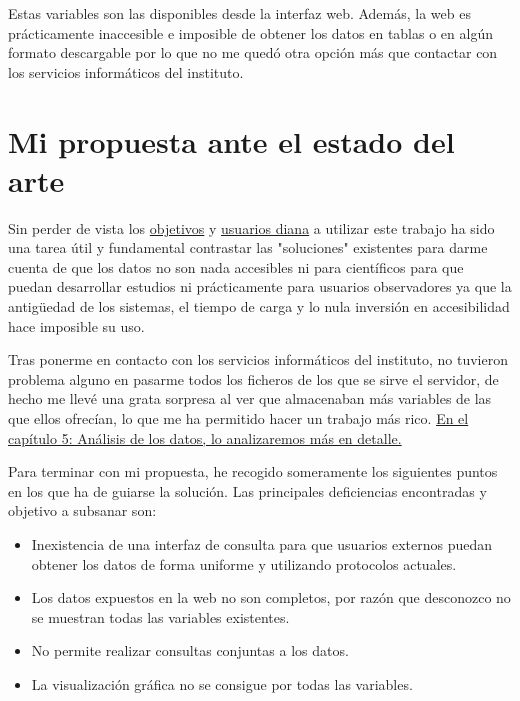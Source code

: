 Estas variables son las disponibles desde la interfaz web. Además, la web es prácticamente
inaccesible e imposible de obtener los datos en tablas o en algún formato descargable por
lo que no me quedó otra opción más que contactar con los servicios informáticos del
instituto.


\section{Mi propuesta ante el estado del arte}

Sin perder de vista los \hyperref[sec:obj]{objetivos} y \hyperref[sec:usu]{usuarios diana}
a utilizar este trabajo ha sido una tarea útil y fundamental contrastar las "soluciones"
existentes para darme cuenta de que los datos no son nada accesibles ni para científicos
para que puedan desarrollar estudios ni prácticamente para usuarios observadores ya que la
antigüedad de los sistemas, el tiempo de carga y lo nula inversión en accesibilidad hace
imposible su uso.

Tras ponerme en contacto con los servicios informáticos del instituto, no tuvieron
problema alguno en pasarme todos los ficheros de los que se sirve el servidor, de hecho me
llevé una grata sorpresa al ver que almacenaban más variables de las que ellos ofrecían,
lo que me ha permitido hacer un trabajo más rico. \hyperref[cap:5]{En el capítulo 5:
Análisis de los datos, lo analizaremos más en detalle.}


Para terminar con mi propuesta, he recogido someramente los siguientes puntos en los que
ha de guiarse la solución. Las principales deficiencias encontradas y objetivo a subsanar
son:
\begin{itemize}
    \item Inexistencia de una interfaz de consulta para que usuarios externos puedan
    obtener los datos de forma uniforme y utilizando protocolos actuales.
    \item Los datos expuestos en la web no son completos, por razón que desconozco no se
    muestran todas las variables existentes.
    \item No permite realizar consultas conjuntas a los datos.
    \item La visualización gráfica no se consigue por todas las variables.
\end{itemize}
